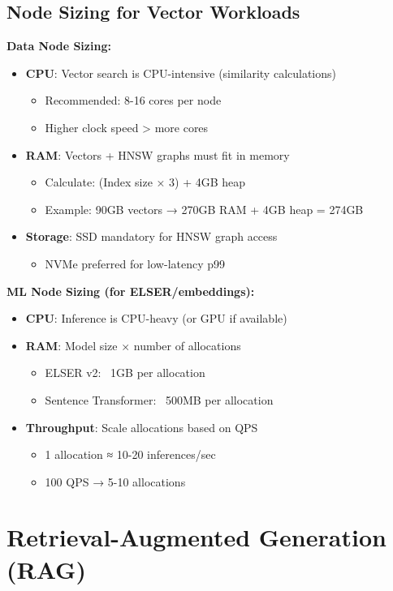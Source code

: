 \documentclass[10pt]{article}
\begin{document}
\subsection{Node Sizing for Vector Workloads}

\textbf{Data Node Sizing:}
\begin{itemize}
\item \textbf{CPU}: Vector search is CPU-intensive (similarity calculations)
  \begin{itemize}
  \item Recommended: 8-16 cores per node
  \item Higher clock speed > more cores
  \end{itemize}
\item \textbf{RAM}: Vectors + HNSW graphs must fit in memory
  \begin{itemize}
  \item Calculate: (Index size × 3) + 4GB heap
  \item Example: 90GB vectors → 270GB RAM + 4GB heap = 274GB
  \end{itemize}
\item \textbf{Storage}: SSD mandatory for HNSW graph access
  \begin{itemize}
  \item NVMe preferred for low-latency p99
  \end{itemize}
\end{itemize}

\textbf{ML Node Sizing (for ELSER/embeddings):}
\begin{itemize}
\item \textbf{CPU}: Inference is CPU-heavy (or GPU if available)
\item \textbf{RAM}: Model size × number of allocations
  \begin{itemize}
  \item ELSER v2: ~1GB per allocation
  \item Sentence Transformer: ~500MB per allocation
  \end{itemize}
\item \textbf{Throughput}: Scale allocations based on QPS
  \begin{itemize}
  \item 1 allocation ≈ 10-20 inferences/sec
  \item 100 QPS → 5-10 allocations
  \end{itemize}
\end{itemize}

\section{Retrieval-Augmented Generation (RAG)}
\end{document}
